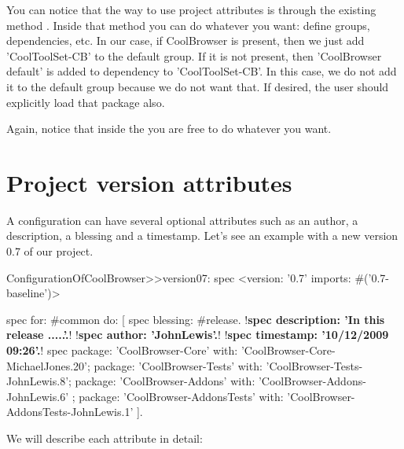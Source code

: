 \documentclass[a4paper,10pt,twoside]{book}
\begin{document}
You can notice that the way to use project attributes is through the existing method . Inside that method you can do whatever you want: define groups, dependencies, etc. In our case, if CoolBrowser is present, then we just add 'CoolToolSet-CB' to the default group. If it is not present, then 'CoolBrowser default' is added to dependency to 'CoolToolSet-CB'. In this case, we do not add it to the default group because we do not want that. If desired, the user should explicitly load that package also. 

Again, notice that inside the  you are free to do whatever you want.

\section{Project version attributes}
 
 
A configuration can have several optional attributes such as   
an author, a description, a blessing and a timestamp.  Let's see an example with a new version 0.7 of our project.
 
\begin{code}{}
ConfigurationOfCoolBrowser>>version07: spec 
	<version: '0.7' imports: #('0.7-baseline')>
	
	spec for: #common do: [
		spec blessing: #release.
		!\textbf{spec description: 'In this release .....'.}!
		!\textbf{spec author: 'JohnLewis'.}!
		!\textbf{spec timestamp: '10/12/2009 09:26'.}!
		spec 
			package: 'CoolBrowser-Core' with: 'CoolBrowser-Core-MichaelJones.20';
			package: 'CoolBrowser-Tests' with: 'CoolBrowser-Tests-JohnLewis.8';
			package: 'CoolBrowser-Addons' with: 'CoolBrowser-Addons-JohnLewis.6' ;
			package: 'CoolBrowser-AddonsTests' with: 'CoolBrowser-AddonsTests-JohnLewis.1' ].
\end{code}
 
We will describe each attribute in detail:
 
\end{document}
